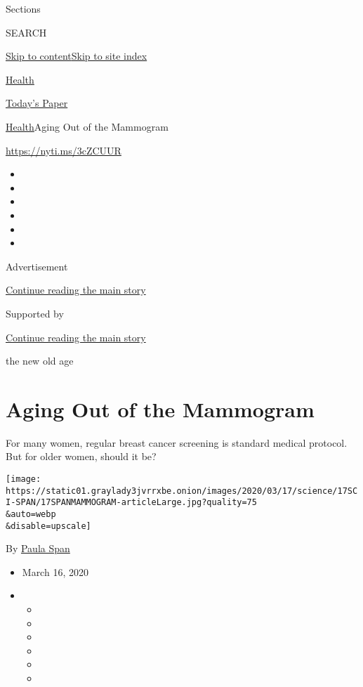 Sections

SEARCH

\protect\hyperlink{site-content}{Skip to
content}\protect\hyperlink{site-index}{Skip to site index}

\href{https://www.nytimes3xbfgragh.onion/section/health}{Health}

\href{https://myaccount.nytimes3xbfgragh.onion/auth/login?response_type=cookie\&client_id=vi}{}

\href{https://www.nytimes3xbfgragh.onion/section/todayspaper}{Today's
Paper}

\href{/section/health}{Health}\textbar{}Aging Out of the Mammogram

\url{https://nyti.ms/3cZCUUR}

\begin{itemize}
\item
\item
\item
\item
\item
\item
\end{itemize}

Advertisement

\protect\hyperlink{after-top}{Continue reading the main story}

Supported by

\protect\hyperlink{after-sponsor}{Continue reading the main story}

the new old age

\hypertarget{aging-out-of-the-mammogram}{%
\section{Aging Out of the Mammogram}\label{aging-out-of-the-mammogram}}

For many women, regular breast cancer screening is standard medical
protocol. But for older women, should it be?

\texttt{[image: https://static01.graylady3jvrrxbe.onion/images/2020/03/17/science/17SCI-SPAN/17SPANMAMMOGRAM-articleLarge.jpg?quality=75\\\&auto=webp\\\&disable=upscale]}

By \href{https://www.nytimes3xbfgragh.onion/by/paula-span}{Paula Span}

\begin{itemize}
\item
  March 16, 2020
\item
  \begin{itemize}
  \item
  \item
  \item
  \item
  \item
  \item
  \end{itemize}
\end{itemize}

